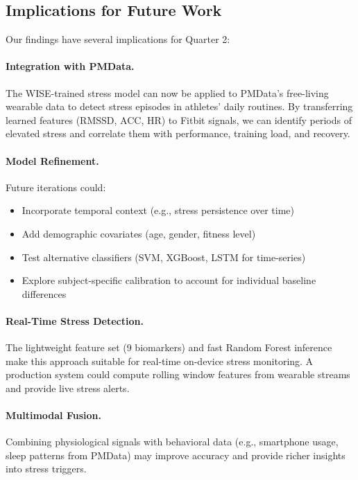 \documentclass[12pt,letterpaper]{article}
\begin{document}
\subsection{Implications for Future Work}

Our findings have several implications for Quarter 2:

\paragraph{Integration with PMData.} The WISE-trained stress model can now be applied to PMData's free-living wearable data to detect stress episodes in athletes' daily routines. By transferring learned features (RMSSD, ACC, HR) to Fitbit signals, we can identify periods of elevated stress and correlate them with performance, training load, and recovery.

\paragraph{Model Refinement.} Future iterations could:
\begin{itemize}
    \item Incorporate temporal context (e.g., stress persistence over time)
    \item Add demographic covariates (age, gender, fitness level)
    \item Test alternative classifiers (SVM, XGBoost, LSTM for time-series)
    \item Explore subject-specific calibration to account for individual baseline differences
\end{itemize}

\paragraph{Real-Time Stress Detection.} The lightweight feature set (9 biomarkers) and fast Random Forest inference make this approach suitable for real-time on-device stress monitoring. A production system could compute rolling window features from wearable streams and provide live stress alerts.

\paragraph{Multimodal Fusion.} Combining physiological signals with behavioral data (e.g., smartphone usage, sleep patterns from PMData) may improve accuracy and provide richer insights into stress triggers.
\end{document}
